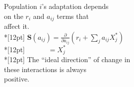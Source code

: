 \documentclass{article}
\begin{document}
\noindent
Population $i$'s adaptation depends\\
on the $r_i$ and $a_{ij}$ terms that\\affect it.
\\*[12pt]
\indent
\( \mathbf{S}(a_{ij}) = \frac{\partial}{\partial a_{ij}}(r_i + \sum_ja_{ij}X_j^*)
\)
\\*[12pt]
\indent
\( \quad\quad\quad = X_j^* \)
\\*[12pt]
\noindent
The ``ideal direction'' of change in\\
these interactions is always\\
positive.
\end{document}

